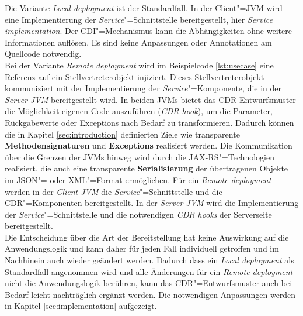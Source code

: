 Die Variante \textit{Local deployment} ist der Standardfall. 
In der Client"=\ac{JVM} wird eine Implementierung der \textit{Service}"=Schnittstelle bereitgestellt, hier \textit{Service implementation}. 
Der \ac{CDI}"=Mechanismus kann die Abhängigkeiten ohne weitere Informationen auflösen. Es sind keine Anpassungen oder Annotationen am Quellcode notwendig.\\
Bei der Variante \textit{Remote deployment} wird im Beispielcode \ref{lst:usecase} eine Referenz auf ein Stellvertreterobjekt injiziert. 
Dieses Stellvertreterobjekt kommuniziert mit der Implementierung der \textit{Service}"=Komponente, die in der \textit{Server JVM} bereitgestellt wird. 
In beiden \ac{JVM}s bietet das \ac{CDR}-Entwurfsmuster die Möglichkeit eigenen Code auszuführen (\textit{CDR hook}), um die Parameter, Rückgabewerte oder Exceptions nach Bedarf zu transformieren. Dadurch können die in Kapitel \ref{sec:introduction} definierten Ziele wie transparente \textbf{Methodensignaturen} und \textbf{Exceptions} realisiert werden.
Die Kommunikation über die Grenzen der \ac{JVM}s hinweg wird durch die \ac{JAX-RS}"=Technologien realisiert, die auch eine transparente \textbf{Serialisierung} der übertragenen Objekte im \ac{JSON}"= oder \ac{XML}"=Format ermöglichen.
Für ein \textit{Remote deployment} werden in der \textit{Client JVM} die \textit{Service}"=Schnittstelle und die \ac{CDR}"=Komponenten bereitgestellt. 
In der \textit{Server JVM} wird die Implementierung der \textit{Service}"=Schnittstelle und die notwendigen \textit{CDR hooks} der Serverseite bereitgestellt.\\
Die Entscheidung über die Art der Bereitstellung hat keine Auswirkung auf die Anwendungslogik und kann daher für jeden Fall individuell getroffen und im Nachhinein auch wieder geändert werden.
Dadurch dass ein \textit{Local deployment} als Standardfall angenommen wird und alle Änderungen für ein \textit{Remote deployment} nicht die Anwendungslogik berühren, kann das \ac{CDR}"=Entwurfsmuster auch bei Bedarf leicht nachträglich ergänzt werden.
Die notwendigen Anpassungen werden in Kapitel \ref{sec:implementation} aufgezeigt.